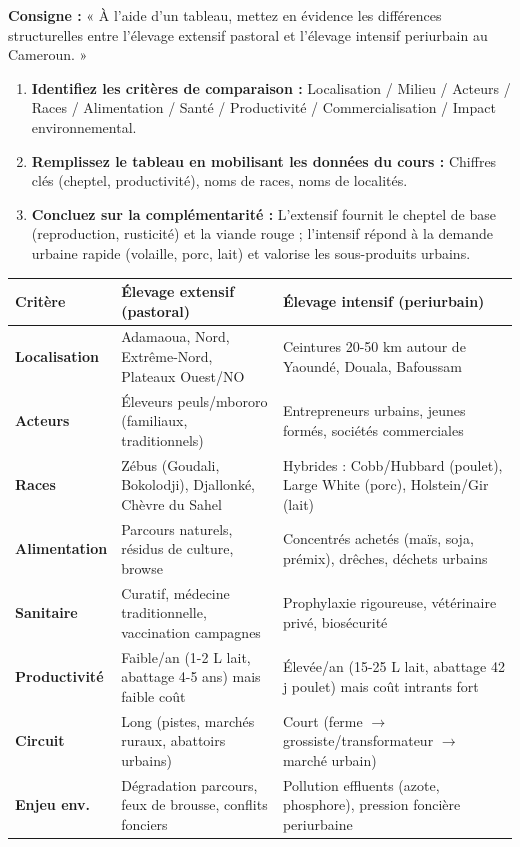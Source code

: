 \documentclass[11pt]{article}
\begin{document}
\begin{methode}
\textbf{Consigne :} « À l'aide d'un tableau, mettez en évidence les différences structurelles entre l'élevage extensif pastoral et l'élevage intensif periurbain au Cameroun. »
\begin{enumerate}
    \item \textbf{Identifiez les critères de comparaison :} Localisation / Milieu / Acteurs / Races / Alimentation / Santé / Productivité / Commercialisation / Impact environnemental.
    \item \textbf{Remplissez le tableau en mobilisant les données du cours :} Chiffres clés (cheptel, productivité), noms de races, noms de localités.
    \item \textbf{Concluez sur la complémentarité :} L'extensif fournit le cheptel de base (reproduction, rusticité) et la viande rouge ; l'intensif répond à la demande urbaine rapide (volaille, porc, lait) et valorise les sous-produits urbains.
\end{enumerate}
\begin{center}
\begin{tabularx}{\linewidth}{|l|X|X|}\hline
\textbf{Critère} & \textbf{Élevage extensif (pastoral)} & \textbf{Élevage intensif (periurbain)} \\ \hline
\textbf{Localisation} & Adamaoua, Nord, Extrême-Nord, Plateaux Ouest/NO & Ceintures 20-50 km autour de Yaoundé, Douala, Bafoussam \\ \hline
\textbf{Acteurs} & Éleveurs peuls/mbororo (familiaux, traditionnels) & Entrepreneurs urbains, jeunes formés, sociétés commerciales \\ \hline
\textbf{Races} & Zébus (Goudali, Bokolodji), Djallonké, Chèvre du Sahel & Hybrides : Cobb/Hubbard (poulet), Large White (porc), Holstein/Gir (lait) \\ \hline
\textbf{Alimentation} & Parcours naturels, résidus de culture, browse & Concentrés achetés (maïs, soja, prémix), drêches, déchets urbains \\ \hline
\textbf{Sanitaire} & Curatif, médecine traditionnelle, vaccination campagnes & Prophylaxie rigoureuse, vétérinaire privé, biosécurité \\ \hline
\textbf{Productivité} & Faible/an (1-2 L lait, abattage 4-5 ans) mais faible coût & Élevée/an (15-25 L lait, abattage 42 j poulet) mais coût intrants fort \\ \hline
\textbf{Circuit} & Long (pistes, marchés ruraux, abattoirs urbains) & Court (ferme $\to$ grossiste/transformateur $\to$ marché urbain) \\ \hline
\textbf{Enjeu env.} & Dégradation parcours, feux de brousse, conflits fonciers & Pollution effluents (azote, phosphore), pression foncière periurbaine \\ \hline
\end{tabularx}
\end{center}
\end{methode}
\end{document}
